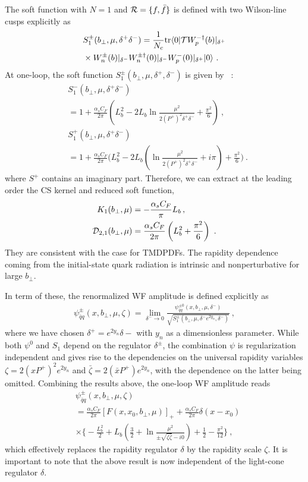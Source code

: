 \documentclass[twocolumn,superscriptaddress,longbibliography,10pt]{revtex4-1}
\begin{document}
The soft function with $N=1$ and ${\cal R}=\{f,\bar f \}$ is defined with two Wilson-line cusps explicitly as
\begin{align}
&S^{\pm}_1(b_\perp,\mu,\delta^+\delta^-)=\frac{1}{N_c} {\rm tr}\langle0|{\cal T}W^{-\dagger}_{p}(b)|_{\delta^+}\nonumber \\ & \times W^{\pm}_{n}(b)|_{\delta^-} W^{\pm \dagger}_n(0)|_{\delta^-} W^-_p(0)|_{\delta^+}|0\rangle \ .
\end{align}
At one-loop, the soft function $S^{\pm}_{1}(b_\perp,\mu,\delta^+,\delta^-)$ is given by~\cite{Echevarria:2012js} :
\begin{align}
&S^{-}_{1}(b_\perp,\mu,\delta^+\delta^-)\nonumber \\ &=1+\frac{\alpha_s C_F}{2\pi}\left(L_b^2-2L_b \ln \frac{\mu^2}{2(P^+)^2\delta^+\delta^-}+\frac{\pi^2}{6}\right) \ , \\
&S^{+}_{1}(b_\perp,\mu,\delta^+\delta^-)\nonumber \\ &=1+\frac{\alpha_s C_F}{2\pi}\bigg(L_b^2-2L_b \left(\ln \frac{\mu^2}{2(P^+)^2\delta^+\delta^-}+i\pi\right)+\frac{\pi^2}{6}\bigg) \ .
\end{align}
where $S^+$ contains an imaginary part.
Therefore, we can extract at the leading order the CS kernel and reduced soft function,
\begin{align}
K_1(b_\perp,\mu)&=-\frac{\alpha_sC_F}{\pi} L_b  \,,\\
{\cal D}_{2,1}(b_\perp,\mu)&=\frac{\alpha_s C_F}{2\pi}\left(L_b^2+\frac{\pi^2}{6}\right) \ .
\end{align}
They are consistent with the case for TMDPDFs. The rapidity dependence coming from the initial-state quark radiation is intrinsic and nonperturbative for large $b_\perp$.

In term of these, the renormalized WF amplitude is defined explicitly as
\begin{align}
\psi^{\pm}_{\bar q q}(x,b_\perp,\mu,\zeta)=\lim_{\delta^-\rightarrow 0}\frac{\psi^{\pm0}_{\bar qq}(x,b_\perp,\mu,\delta^-)}{\sqrt{S^{\pm}_1(b_\perp,\mu,\delta^-e^{2y_n},\delta^-)}} \ ,
\end{align}
where we have chosen $\delta^+ = e^{2y_n}\delta-$ with $y_n$
as a dimensionless parameter.
While both $\psi^0$ and $S_1$ depend on the regulator $\delta^{\pm}$, the combination $\psi$ is regularization independent and gives rise to the dependencies on the universal rapidity variables $\zeta=2(xP^+)^2e^{2y_n}$ and $\bar\zeta=2(\bar x P^+)e^{2y_n}$, with the dependence on the latter being omitted. Combining the results above, the one-loop WF amplitude reads
\begin{align}
&\psi^{\pm}_{\bar q q}(x,b_\perp, \mu,\zeta) \\
&=\frac{\alpha_s C_F}{2\pi}\left[F(x,x_0,b_\perp,\mu)\right]_{+}+\frac{\alpha_s C_F}{2\pi}\delta\left(x-x_0\right)\nonumber \\
&\times \Bigg\{-\frac{L_b^2}{2}+L_b\left(\frac{3}{2}+\ln \frac{\mu^2}{\pm \sqrt{\zeta \bar \zeta}-i0}\right)+\frac{1}{2}-\frac{\pi^2}{12}\Bigg\} \ , \nonumber
\end{align}
which effectively replaces the rapidity regulator $\delta$ by the rapidity scale $\zeta$. It is important to note that the above result is now independent of the light-cone regulator $\delta$.
\end{document}
